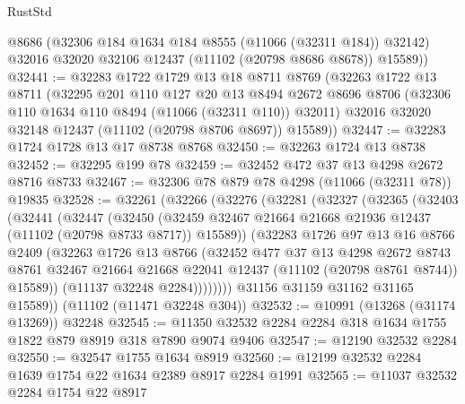 \begin{lexlean}{RustStd}
\begin{coremodule}
        @8686
        (@32306 @184 @1634 @184 @8555 (@11066 (@32311 @184)) @32142)
        @32016
        @32020
        @32106
        @12437
        (@11102 (@20798 @8686 @8678))
        @15589))
@32441 := @32283
    @1722
    @1729
    @13
    @18
    @8711
    @8769
    (@32263
      @1722
      @13
      @8711
      (@32295
        @201
        @110
        @127
        @20
        @13
        @8494
        @2672
        @8696
        @8706
        (@32306 @110 @1634 @110 @8494 (@11066 (@32311 @110)) @32011)
        @32016
        @32020
        @32148
        @12437
        (@11102 (@20798 @8706 @8697))
        @15589))
@32447 := @32283 @1724 @1728 @13 @17 @8738 @8768
@32450 := @32263 @1724 @13 @8738
@32452 := @32295 @199 @78
@32459 := @32452 @472 @37 @13 @4298 @2672 @8716 @8733
@32467 := @32306 @78 @879 @78 @4298 (@11066 (@32311 @78)) @19835
@32528 := @32261
    (@32266
      (@32276
        (@32281
          (@32327
            (@32365
              (@32403
                (@32441
                  (@32447
                    (@32450
                      (@32459
                        @32467
                        @21664
                        @21668
                        @21936
                        @12437
                        (@11102 (@20798 @8733 @8717))
                        @15589))
                    (@32283
                      @1726
                      @97
                      @13
                      @16
                      @8766
                      @2409
                      (@32263
                        @1726
                        @13
                        @8766
                        (@32452
                          @477
                          @37
                          @13
                          @4298
                          @2672
                          @8743
                          @8761
                          @32467
                          @21664
                          @21668
                          @22041
                          @12437
                          (@11102 (@20798 @8761 @8744))
                          @15589))
                      (@11137 @32248 @2284))))))))
        @31156
        @31159
        @31162
        @31165
        @15589))
    (@11102 (@11471 @32248 @304))
@32532 := @10991 (@13268 (@31174 @13269)) @32248
@32545 := @11350 @32532 @2284 @2284 @318 @1634 @1755 @1822 @879 @8919 @318 @7890 @9074 @9406
@32547 := @12190 @32532 @2284
@32550 := @32547 @1755 @1634 @8919
@32560 := @12199 @32532 @2284 @1639 @1754 @22 @1634 @2389 @8917 @2284 @1991
@32565 := @11037 @32532 @2284 @1754 @22 @8917

\end{coremodule}
\end{lexlean}

